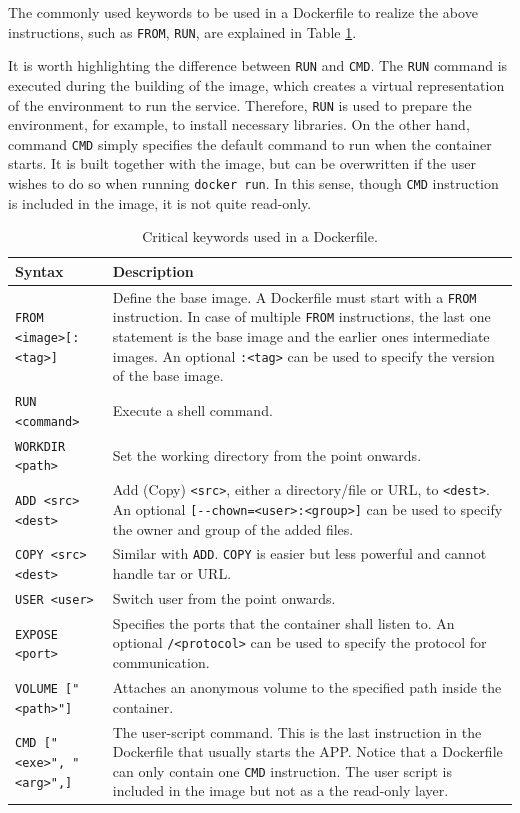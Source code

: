 The commonly used keywords to be used in a Dockerfile to realize the above instructions, such as \verb|FROM|, \verb|RUN|, are explained in Table \ref{ch:vac:tab:keywordsdockerfile}. 

It is worth highlighting the difference between \verb|RUN| and \verb|CMD|. The \verb|RUN| command is executed during the building of the image, which creates a virtual representation of the environment to run the service. Therefore, \verb|RUN| is used to prepare the environment, for example, to install necessary libraries. On the other hand, command \verb|CMD| simply specifies the default command to run when the container starts. It is built together with the image, but can be overwritten if the user wishes to do so when running \verb|docker run|. In this sense, though \verb|CMD| instruction is included in the image, it is not quite read-only.

\begin{table}[!htb]
	\centering \caption{Critical keywords used in a Dockerfile.}\label{ch:vac:tab:keywordsdockerfile}
	\begin{tabularx}{\textwidth}{lX}
		\hline
		Syntax & Description \\ \hline
		\verb|FROM <image>[:<tag>]| & Define the base image. A Dockerfile must start with a \verb|FROM| instruction. In case of multiple \verb|FROM| instructions, the last one statement is the base image and the earlier ones intermediate images. An optional \verb|:<tag>| can be used to specify the version of the base image. \\ 
		\verb|RUN <command>| & Execute a shell command. \\ 
		\verb|WORKDIR <path>| & Set the working directory from the point onwards. \\ 
		\verb|ADD <src> <dest>| & Add (Copy) \verb|<src>|, either a directory/file or URL, to \verb|<dest>|. An optional \verb|[--chown=<user>:<group>]| can be used to specify the owner and group of the added files. \\ 
		\verb|COPY <src> <dest>| & Similar with \verb|ADD|. \verb|COPY| is easier but less powerful and cannot handle tar or URL. \\ 
		\verb|USER <user>| & Switch user from the point onwards. \\ 
		\verb|EXPOSE <port>| & Specifies the ports that the container shall listen to. An optional \verb|/<protocol>| can be used to specify the protocol for communication. \\
        \verb|VOLUME ["<path>"]| & Attaches an anonymous volume to the specified path inside the container. \\
		\verb|CMD ["<exe>", "<arg>",]| & The user-script command. This is the last instruction in the Dockerfile that usually starts the APP. Notice that a Dockerfile can only contain one \verb|CMD| instruction. The user script is included in the image but not as a the read-only layer. \\
		\hline
	\end{tabularx}
\end{table}

